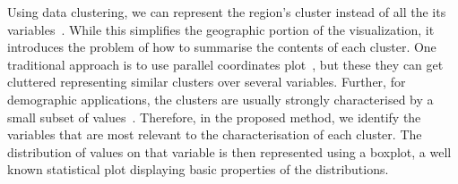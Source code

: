 Using data clustering, we can represent the region's cluster instead of all the
its variables~\citep{Alce2018,Valdivia2015,VonLandesberger2016}. While this
simplifies the geographic portion of the visualization, it introduces the
problem of how to summarise the contents of each cluster. One traditional
approach is to use parallel coordinates plot~\citep{ferreira2015urbane}, but
these they can get cluttered representing similar clusters over several
variables. Further, for demographic applications, the clusters are usually
strongly characterised by a small subset of
values~\citep{Delmelle2016,Delmelle2017}. Therefore, in the proposed method, we
identify the variables that are most relevant to the characterisation of each
cluster. The distribution of values on that variable is then represented using a
boxplot, a well known statistical plot displaying basic properties of the
distributions.